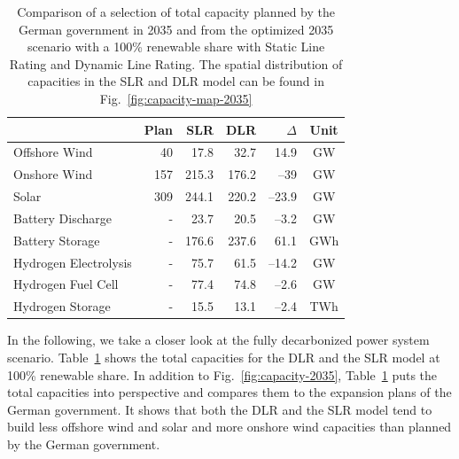 \documentclass[preprint,12pt]{elsarticle}
\begin{document}
\begin{table}[!h]
    \caption{Comparison of a selection of total capacity planned by the German government in 2035 \cite{federalministryofeconomicaffairsandclimateactionRegulationDraftEEG2022, federalministryofeconomicaffairsandclimateactionUeberblickspapierOsterpaket2022} and from the optimized 2035 scenario with a 100\% renewable share with Static Line Rating and Dynamic Line Rating. The spatial distribution of capacities in the SLR and DLR model can be found in Fig.~\ref{fig:capacity-map-2035}}
    \centering
    \begin{tabular}{lrrrrc}
        & Plan & SLR & DLR & $\Delta$ & Unit  \\
        \hline
        Offshore Wind & 40 & 17.8 & 32.7 & 14.9 & GW \\
        Onshore Wind & 157 & 215.3 & 176.2 & --39 & GW \\
        Solar & 309 & 244.1 & 220.2 & --23.9 & GW \\
        Battery Discharge & - & 23.7 & 20.5 & --3.2 & GW \\
        Battery Storage & - & 176.6 & 237.6 & 61.1 & GWh \\
        Hydrogen Electrolysis & - & 75.7 & 61.5 & --14.2 & GW \\
        Hydrogen Fuel Cell & - & 77.4 & 74.8 & --2.6 & GW \\
        Hydrogen Storage & - & 15.5 & 13.1 & --2.4 & TWh \\
        \hline
    \end{tabular}
    \label{tab:installed capacity_2035}
\end{table}
In the following, we take a closer look at the fully decarbonized power system scenario. Table~\ref{tab:installed capacity_2035} shows the total capacities for the DLR and the SLR model at 100\% renewable share.
In addition to Fig.~\ref{fig:capacity-2035}, Table~\ref{tab:installed capacity_2035} puts the total capacities into perspective and compares them to the expansion plans of the German government. It shows that both the DLR and the SLR model tend to build less offshore wind and solar and more onshore wind capacities than planned by the German government.
%
\end{document}
